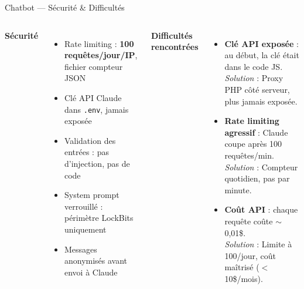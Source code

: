\documentclass[xcolor=dvipsnames, aspectratio=169, 10pt]{beamer}
\newcommand{\bitem}{\item[$\bullet$]}
\begin{document}
\begin{frame}{Chatbot — Sécurité \& Difficultés}
  \begin{columns}[t]
    \textbf{Sécurité}
    \begin{itemize}
      \bitem Rate limiting : \textbf{100 requêtes/jour/IP}, fichier compteur JSON
      \bitem Clé API Claude dans \texttt{.env}, jamais exposée
      \bitem Validation des entrées : pas d'injection, pas de code
      \bitem System prompt verrouillé : périmètre LockBits uniquement
      \bitem Messages anonymisés avant envoi à Claude
    \end{itemize}
    \textbf{Difficultés rencontrées}
    \begin{itemize}
      \bitem \textbf{Clé API exposée} : au début, la clé était dans le code JS.\\
            \textit{Solution} : Proxy PHP côté serveur, plus jamais exposée.
      \bitem \textbf{Rate limiting agressif} : Claude coupe après 100 requêtes/min.\\
            \textit{Solution} : Compteur quotidien, pas par minute.
      \bitem \textbf{Coût API} : chaque requête coûte $\sim$0,01\$.\\
            \textit{Solution} : Limite à 100/jour, coût maîtrisé ($<$ 10\$/mois).
    \end{itemize}
  \end{columns}
\end{frame}
\end{document}
